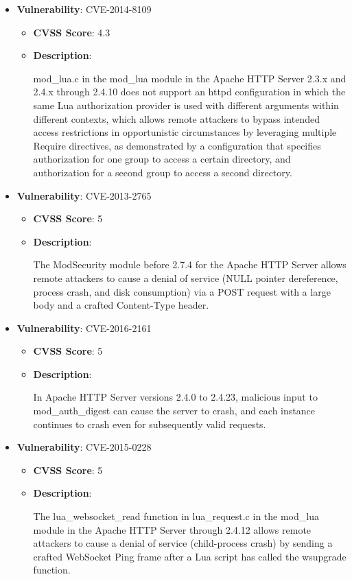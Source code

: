 \documentclass{article}
\begin{document}
\begin{itemize}
        \item \textbf{Vulnerability}: CVE-2014-8109
        \begin{itemize}
            \item \textbf{CVSS Score}:  4.3 
            \item \textbf{Description}:
            \parbox[t]{0.9\linewidth}{
                \ttfamily mod\_lua.c in the mod\_lua module in the Apache HTTP Server 2.3.x and 2.4.x through 2.4.10 does not support an httpd configuration in which the same Lua authorization provider is used with different arguments within different contexts, which allows remote attackers to bypass intended access restrictions in opportunistic circumstances by leveraging multiple Require directives, as demonstrated by a configuration that specifies authorization for one group to access a certain directory, and authorization for a second group to access a second directory.
            }
        \end{itemize}
    
        \item \textbf{Vulnerability}: CVE-2013-2765
        \begin{itemize}
            \item \textbf{CVSS Score}:  5 
            \item \textbf{Description}:
            \parbox[t]{0.9\linewidth}{
                \ttfamily The ModSecurity module before 2.7.4 for the Apache HTTP Server allows remote attackers to cause a denial of service (NULL pointer dereference, process crash, and disk consumption) via a POST request with a large body and a crafted Content-Type header.
            }
        \end{itemize}
    
        \item \textbf{Vulnerability}: CVE-2016-2161
        \begin{itemize}
            \item \textbf{CVSS Score}:  5 
            \item \textbf{Description}:
            \parbox[t]{0.9\linewidth}{
                \ttfamily In Apache HTTP Server versions 2.4.0 to 2.4.23, malicious input to mod\_auth\_digest can cause the server to crash, and each instance continues to crash even for subsequently valid requests.
            }
        \end{itemize}
    
        \item \textbf{Vulnerability}: CVE-2015-0228
        \begin{itemize}
            \item \textbf{CVSS Score}:  5 
            \item \textbf{Description}:
            \parbox[t]{0.9\linewidth}{
                \ttfamily The lua\_websocket\_read function in lua\_request.c in the mod\_lua module in the Apache HTTP Server through 2.4.12 allows remote attackers to cause a denial of service (child-process crash) by sending a crafted WebSocket Ping frame after a Lua script has called the wsupgrade function.
            }
        \end{itemize}
    

\end{itemize}
\end{document}
